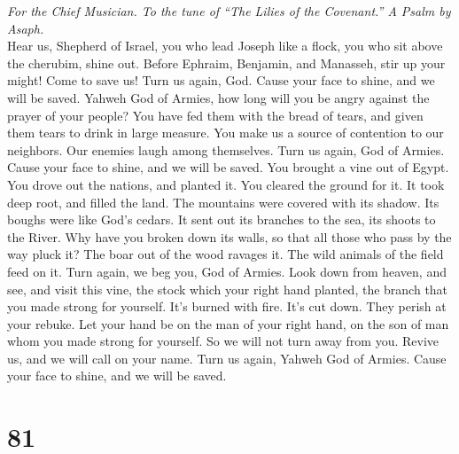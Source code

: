 \emph{For the Chief Musician. To the tune of ``The Lilies of the
Covenant.'' A Psalm by Asaph.}\\
 Hear us, Shepherd of Israel, you who lead Joseph like a
flock, you who sit above the cherubim, shine out.  Before
Ephraim, Benjamin, and Manasseh, stir up your might! Come to save us!
 Turn us again, God. Cause your face to shine, and we will
be saved.  Yahweh God of Armies, how long will you be
angry against the prayer of your people?  You have fed
them with the bread of tears, and given them tears to drink in large
measure.  You make us a source of contention to our
neighbors. Our enemies laugh among themselves.  Turn us
again, God of Armies. Cause your face to shine, and we will be saved.
 You brought a vine out of Egypt. You drove out the
nations, and planted it.  You cleared the ground for it.
It took deep root, and filled the land.  The mountains
were covered with its shadow. Its boughs were like God's cedars.
 It sent out its branches to the sea, its shoots to the
River.  Why have you broken down its walls, so that all
those who pass by the way pluck it?  The boar out of the
wood ravages it. The wild animals of the field feed on it.
 Turn again, we beg you, God of Armies. Look down from
heaven, and see, and visit this vine,  the stock which
your right hand planted, the branch that you made strong for yourself.
 It's burned with fire. It's cut down. They perish at
your rebuke.  Let your hand be on the man of your right
hand, on the son of man whom you made strong for yourself.
 So we will not turn away from you. Revive us, and we
will call on your name.  Turn us again, Yahweh God of
Armies. Cause your face to shine, and we will be saved.

\hypertarget{section-80}{%
\section{81}\label{section-80}}

